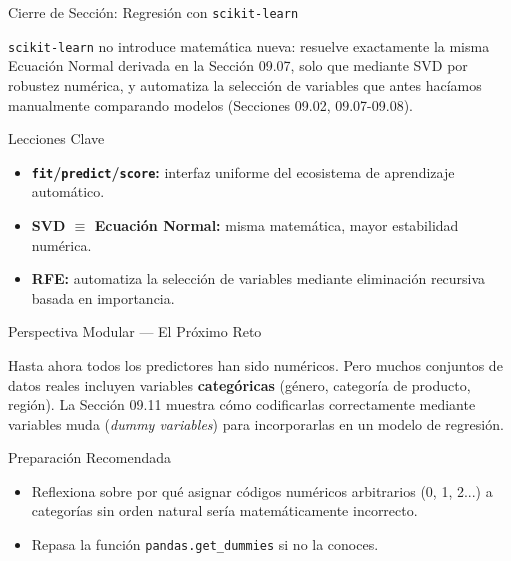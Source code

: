 \documentclass[10pt, aspectratio=169]{beamer}
\begin{document}
\begin{frame}{Cierre de Sección: Regresión con \texttt{scikit-learn}}
  \begin{reflexion}
    \texttt{scikit-learn} no introduce matemática nueva: resuelve exactamente la misma Ecuación Normal derivada en la Sección 09.07, solo que mediante SVD por robustez numérica, y automatiza la selección de variables que antes hacíamos manualmente comparando modelos (Secciones 09.02, 09.07-09.08).
  \end{reflexion}

  \vspace{0.2cm}
  \pause
  \begin{block}{Lecciones Clave}
    \begin{itemize}\itemsep=0.08cm
      \item \textbf{\texttt{fit}/\texttt{predict}/\texttt{score}:} interfaz uniforme del ecosistema de aprendizaje automático.
      \item \textbf{SVD $\equiv$ Ecuación Normal:} misma matemática, mayor estabilidad numérica.
      \item \textbf{RFE:} automatiza la selección de variables mediante eliminación recursiva basada en importancia.
    \end{itemize}
  \end{block}
\end{frame}

\begin{frame}{Perspectiva Modular --- El Próximo Reto}
  \scriptsize
  \begin{retoclase}
    Hasta ahora todos los predictores han sido numéricos. Pero muchos conjuntos de datos reales incluyen variables \textbf{categóricas} (género, categoría de producto, región). La Sección 09.11 muestra cómo codificarlas correctamente mediante variables muda (\emph{dummy variables}) para incorporarlas en un modelo de regresión.
  \end{retoclase}

  \vspace{0.08cm}
  \pause
  \begin{alertblock}{Preparación Recomendada}
    \begin{itemize}\itemsep=0.06cm
      \item Reflexiona sobre por qué asignar códigos numéricos arbitrarios (0, 1, 2...) a categorías sin orden natural sería matemáticamente incorrecto.
      \item Repasa la función \texttt{pandas.get\_dummies} si no la conoces.
    \end{itemize}
  \end{alertblock}
\end{frame}
\end{document}
